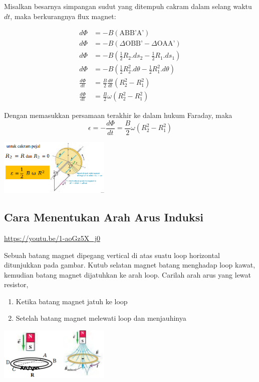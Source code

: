\documentclass[twocolumn, 11pt]{article}%
\begin{document}
Misalkan besarnya simpangan sudut yang ditempuh cakram dalam selang waktu
$dt$, maka berkurangnya flux magnet:

\begin{align*}
    d\Phi &= -B(\text{ABB'A'})\\
    d\Phi &= -B(\Delta \text{OBB'} - \Delta \text{OAA'})\\
    d\Phi &= -B(\frac12R_2. ds_2 - \frac12 R_1. ds_1)\\
    d\Phi &= -B(\frac12R_2^2. d\theta - \frac12 R_1^2. d\theta)\\
    \frac{d\Phi}{dt} &= \frac{B}2 \frac{d\theta}{dt} (R_2^2-R_1^2)\\
    \frac{d\Phi}{dt} &= \frac{B}2 \omega (R_2^2-R_1^2)
\end{align*}

Dengan memasukkan persamaan terakhir ke dalam hukum Faraday, maka
\[ \epsilon=-\frac{d\Phi}{dt} = \frac{B}2 \omega (R_2^2-R_1^2) \]

\begin{center}
    \includegraphics[width=200px]{9.png}
\end{center}

\subsection{Cara Menentukan Arah Arus Induksi}%
\begin{center}
    \url{https://youtu.be/1-aoGz5X_j0}
\end{center}

Sebuah batang magnet dipegang vertical di atas suatu loop horizontal ditunjukkan pada gambar. Kutub selatan magnet batang menghadap loop kawat, kemudian batang magnet dijatuhkan ke arah loop. Carilah arah arus yang lewat resistor,
\begin{enumerate}[label=\alph*).]
    \item Ketika batang magnet jatuh ke loop
    \item Setelah batang magnet melewati loop dan menjauhinya
\end{enumerate}

\begin{center}
    \includegraphics[width=200px]{10.png}
\end{center}
\end{document}
